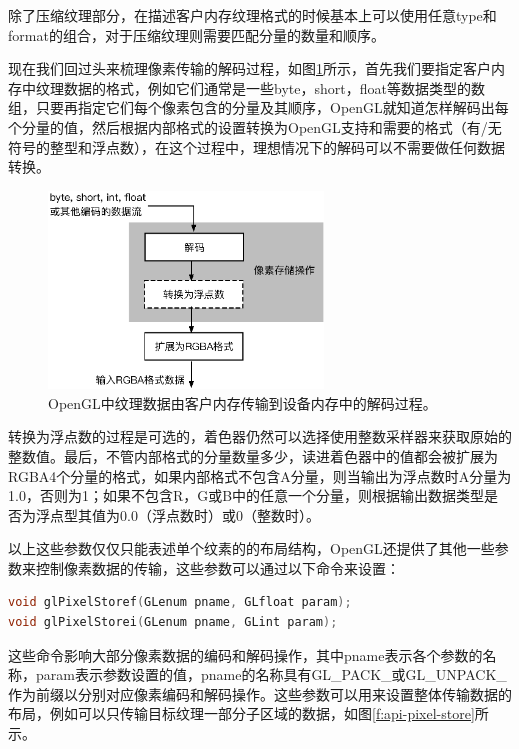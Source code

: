 除了压缩纹理部分，在描述客户内存纹理格式的时候基本上可以使用任意type和format的组合，对于压缩纹理则需要匹配分量的数量和顺序。

现在我们回过头来梳理像素传输的解码过程，如图\ref{f:api-unpack}所示，首先我们要指定客户内存中纹理数据的格式，例如它们通常是一些byte，short，float等数据类型的数组，只要再指定它们每个像素包含的分量及其顺序，OpenGL就知道怎样解码出每个分量的值，然后根据内部格式的设置转换为OpenGL支持和需要的格式（有/无符号的整型和浮点数），在这个过程中，理想情况下的解码可以不需要做任何数据转换。

\begin{figure}
\sidecaption
	\includegraphics[width=0.65\textwidth]{figures/api/unpack}
	\caption{OpenGL中纹理数据由客户内存传输到设备内存中的解码过程。}
	\label{f:api-unpack}
\end{figure}

转换为浮点数的过程是可选的，着色器仍然可以选择使用整数采样器来获取原始的整数值。最后，不管内部格式的分量数量多少，读进着色器中的值都会被扩展为RGBA4个分量的格式，如果内部格式不包含A分量，则当输出为浮点数时A分量为1.0，否则为1；如果不包含R，G或B中的任意一个分量，则根据输出数据类型是否为浮点型其值为0.0（浮点数时）或0（整数时）。

以上这些参数仅仅只能表述单个纹素的的布局结构，OpenGL还提供了其他一些参数来控制像素数据的传输，这些参数可以通过以下命令来设置：

\begin{lstlisting}[language=C++]
void glPixelStoref(GLenum pname​, GLfloat param​);
void glPixelStorei(GLenum pname​, GLint param​);
\end{lstlisting}

这些命令影响大部分像素数据的编码和解码操作，其中pname表示各个参数的名称，param表示参数设置的值，pname的名称具有GL\_PACK\_或GL\_UNPACK\_作为前缀以分别对应像素编码和解码操作。这些参数可以用来设置整体传输数据的布局，例如可以只传输目标纹理一部分子区域的数据，如图\ref{f:api-pixel-store}所示。

